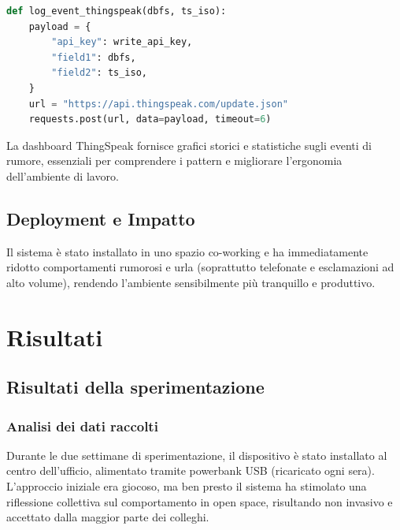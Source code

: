 \documentclass[fleqn,10pt]{SelfArx} %
\begin{document}
\begin{lstlisting}[language=Python]
	def log_event_thingspeak(dbfs, ts_iso):
	payload = {
		"api_key": write_api_key,
		"field1": dbfs,
		"field2": ts_iso,
	}
	url = "https://api.thingspeak.com/update.json"
	requests.post(url, data=payload, timeout=6)
\end{lstlisting}

La dashboard ThingSpeak fornisce grafici storici e statistiche sugli eventi di rumore, essenziali per comprendere i pattern e migliorare l’ergonomia dell’ambiente di lavoro.


\subsection{Deployment e Impatto}

Il sistema è stato installato in uno spazio co-working e ha immediatamente ridotto comportamenti rumorosi e urla (soprattutto telefonate e esclamazioni ad alto volume), rendendo l’ambiente sensibilmente più tranquillo e produttivo.



\section{Risultati}

\subsection{Risultati della sperimentazione}

\subsubsection{Analisi dei dati raccolti}

Durante le due settimane di sperimentazione, il dispositivo è stato installato al centro dell'ufficio, alimentato tramite powerbank USB (ricaricato ogni sera). L'approccio iniziale era giocoso, ma ben presto il sistema ha stimolato una riflessione collettiva sul comportamento in open space, risultando non invasivo e accettato dalla maggior parte dei colleghi.
\end{document}
